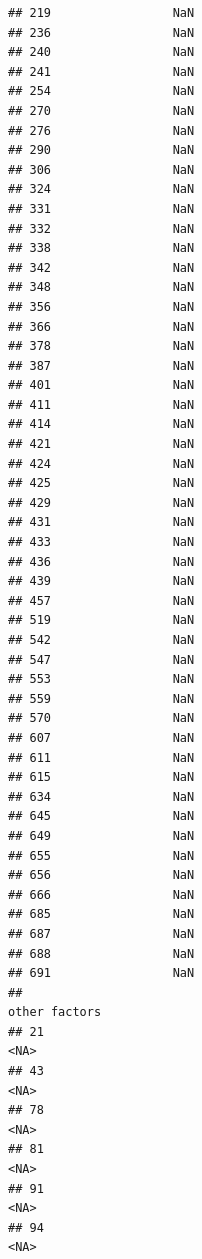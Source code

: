 \documentclass[
]{article}
\begin{document}
\begin{verbatim}
## 219                 NaN
## 236                 NaN
## 240                 NaN
## 241                 NaN
## 254                 NaN
## 270                 NaN
## 276                 NaN
## 290                 NaN
## 306                 NaN
## 324                 NaN
## 331                 NaN
## 332                 NaN
## 338                 NaN
## 342                 NaN
## 348                 NaN
## 356                 NaN
## 366                 NaN
## 378                 NaN
## 387                 NaN
## 401                 NaN
## 411                 NaN
## 414                 NaN
## 421                 NaN
## 424                 NaN
## 425                 NaN
## 429                 NaN
## 431                 NaN
## 433                 NaN
## 436                 NaN
## 439                 NaN
## 457                 NaN
## 519                 NaN
## 542                 NaN
## 547                 NaN
## 553                 NaN
## 559                 NaN
## 570                 NaN
## 607                 NaN
## 611                 NaN
## 615                 NaN
## 634                 NaN
## 645                 NaN
## 649                 NaN
## 655                 NaN
## 656                 NaN
## 666                 NaN
## 685                 NaN
## 687                 NaN
## 688                 NaN
## 691                 NaN
##                                                                                                                                                                                        other factors
## 21                                                                                                                                                                                              <NA>
## 43                                                                                                                                                                                              <NA>
## 78                                                                                                                                                                                              <NA>
## 81                                                                                                                                                                                              <NA>
## 91                                                                                                                                                                                              <NA>
## 94                                                                                                                                                                                              <NA>

\end{verbatim}
\end{document}
